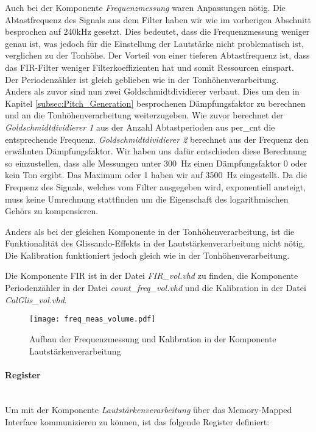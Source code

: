 Auch bei der Komponente \textit{Frequenzmessung} waren Anpassungen nötig. 
Die Abtastfrequenz des Signals aus dem Filter haben wir wie im vorherigen Abschnitt besprochen auf 240kHz gesetzt. Dies bedeutet, dass die Frequenzmessung weniger genau ist, was jedoch für die Einstellung der Lautstärke nicht problematisch ist, verglichen zu der Tonhöhe. Der Vorteil von einer tieferen Abtastfrequenz ist, dass das FIR-Filter weniger Filterkoeffizienten hat und somit Ressourcen einspart.\\
Der Periodenzähler ist gleich geblieben wie in der Tonhöhenverarbeitung.\\
Anders als zuvor sind nun zwei Goldschmidtdividierer verbaut. Dies um den in Kapitel \ref{subsec:Pitch_Generation} besprochenen Dämpfungsfaktor zu berechnen und an die Tonhöhenverarbeitung weiterzugeben. Wie zuvor berechnet der \textit{Goldschmidtdividierer 1} aus der Anzahl Abtastperioden aus per\_cnt die entsprechende Frequenz. \textit{Goldschmidtdividierer 2} berechnet aus der Frequenz den erwähnten Dämpfungsfaktor. Wir haben uns dafür entschieden diese Berechnung so einzustellen, dass alle Messungen unter \SI{300}{Hz} einen Dämpfungsfaktor 0 oder kein Ton ergibt. Das Maximum oder 1 haben wir auf \SI{3500}{Hz} eingestellt. Da die Frequenz des Signals, welches vom Filter ausgegeben wird, exponentiell ansteigt, muss keine Umrechnung stattfinden um die Eigenschaft des logarithmischen Gehörs zu kompensieren.

Anders als bei der gleichen Komponente in der Tonhöhenverarbeitung, ist die Funktionalität des Glissando-Effekts in der Lautstärkenverarbeitung nicht nötig. Die Kalibration funktioniert jedoch gleich wie in der Tonhöhenverarbeitung.

Die Komponente FIR ist in der Datei \textit{FIR\_vol.vhd} zu finden, die Komponente Periodenzähler in der Datei \textit{count\_freq\_vol.vhd} und die Kalibration in der Datei \textit{CalGlis\_vol.vhd}.

\begin{figure}[h!]
	\centering
	\texttt{[image: freq\_meas\_volume.pdf]}
	\caption{Aufbau der Frequenzmessung und Kalibration in der Komponente Lautstärkenverarbeitung} 
	\label{img:freq_meas_volume}
\end{figure}  

\newpage

\paragraph{Register}\mbox{}\\
Um mit der Komponente \textit{Lautstärkenverarbeitung} über das Memory-Mapped Interface kommunizieren zu können, ist das folgende Register definiert:


